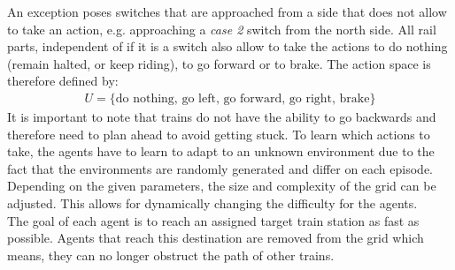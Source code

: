 An exception poses switches that are approached from a side that does not allow to take an action, e.g. approaching a \textit{case 2} switch from the north side.
All rail parts, independent of if it is a switch also allow to take the actions to do nothing (remain halted, or keep riding), to go forward or to brake.
The action space is therefore defined by:
\begin{gather*}
U = \{ \text{do nothing, go left, go forward, go right, brake} \}
\end{gather*}
It is important to note that trains do not have the ability to go backwards and therefore need to plan ahead to avoid getting stuck. To learn which actions to take, the agents have to learn to adapt to an unknown environment due to the fact that the environments are randomly generated and differ on each episode. Depending on the given parameters, the size and complexity of the grid can be adjusted. This allows for dynamically changing the difficulty for the agents.\\
The goal of each agent is to reach an assigned target train station as fast as possible. Agents that reach this destination are removed from the grid which means, they can no longer obstruct the path of other trains.


